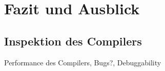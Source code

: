 \part{Fazit und Ausblick}
\chapter{Inspektion des Compilers}
\label{chapter}

Performance des Compilers, Bugs?, Debuggability
